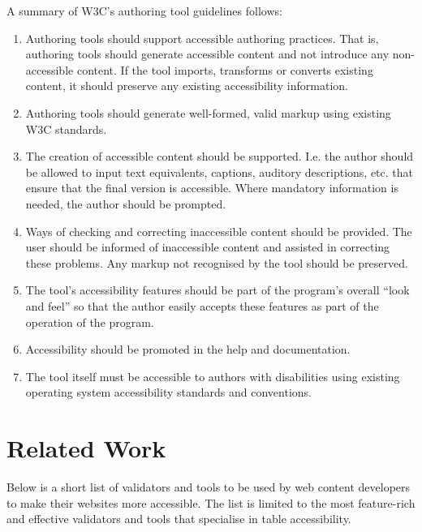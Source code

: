 A summary of W3C's authoring tool guidelines follows:

\begin{enumerate}

\item Authoring tools should support accessible authoring practices. That is,
authoring tools should generate accessible content and not introduce any
non-accessible content. If the tool imports, transforms or converts existing
content, it should preserve any existing accessibility information.

\item Authoring tools should generate well-formed, valid markup using 
existing W3C standards.

\item The creation of accessible content should be supported. I.e. the author
should be allowed to input text equivalents, captions, auditory descriptions,
etc. that ensure that the final version is accessible. Where mandatory
information is needed, the author should be prompted.

\item Ways of checking and correcting inaccessible content should be provided.
The user should be informed of inaccessible content and assisted in correcting
these problems. Any markup not recognised by the tool should be preserved.

\item The tool's accessibility features should be part of the program's overall
``look and feel'' so that the author easily accepts these features as part
of the operation of the program.

\item Accessibility should be promoted in the help and documentation.

\item The tool itself must be accessible to authors with disabilities using
existing operating system accessibility standards and conventions. 

\end{enumerate}

\section{Related Work}

\label{relatedwork}

Below is a short list of validators and tools to be used by web content
developers to make their websites more accessible. The list is limited to the
most feature-rich and effective validators and tools that specialise in
table accessibility.

